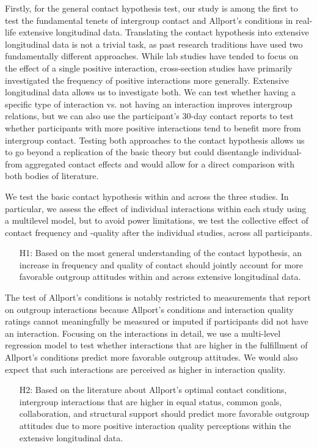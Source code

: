 \documentclass[man, 12pt, a4paper, mask]{apa7}
\theoremstyle{break}
\theoremstyle{plain}
\begin{document}
Firstly, for the general contact hypothesis test, our study is among the first to test the fundamental tenets of intergroup contact and Allport's conditions in real-life extensive longitudinal data. Translating the contact hypothesis into extensive longitudinal data is not a trivial task, as past research traditions have used two fundamentally different approaches. While lab studies have tended to focus on the effect of a single positive interaction, cross-section studies have primarily investigated the frequency of positive interactions more generally. Extensive longitudinal data allows us to investigate both. We can test whether having a specific type of interaction vs. not having an interaction improves intergroup relations, but we can also use the participant's 30-day contact reports to test whether participants with more positive interactions tend to benefit more from intergroup contact. Testing both approaches to the contact hypothesis allows us to go beyond a replication of the basic theory but could disentangle individual- from aggregated contact effects and would allow for a direct comparison with both bodies of literature. 

We test the basic contact hypothesis within and across the three studies. In particular, we assess the effect of individual interactions within each study using a multilevel model, but to avoid power limitations, we test the collective effect of contact frequency and -quality after the individual studies, across all participants.
\begin{enumerate}[leftmargin=1.5\parindent]
    \item[H1:] Based on the most general understanding of the contact hypothesis, an increase in frequency and quality of contact should jointly account for more favorable outgroup attitudes within and across extensive longitudinal data.
\end{enumerate}

The test of Allport's conditions is notably restricted to measurements that report on outgroup interactions because Allport's conditions and interaction quality ratings cannot meaningfully be measured or imputed if participants did not have an interaction. Focusing on the interactions in detail, we use a multi-level regression model to test whether interactions that are higher in the fulfillment of Allport's conditions predict more favorable outgroup attitudes. We would also expect that such interactions are perceived as higher in interaction quality.
\begin{enumerate}[leftmargin=1.5\parindent]
    \item[H2:] Based on the literature about Allport’s optimal contact conditions, intergroup interactions that are higher in equal status, common goals, collaboration, and structural support should predict more favorable outgroup attitudes due to more positive interaction quality perceptions within the extensive longitudinal data.
\end{enumerate}
\end{document}
